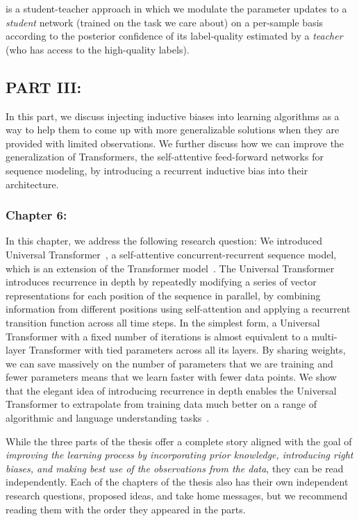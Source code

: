 \fwl is a student-teacher approach in which we modulate the parameter updates to a \emph{student} network (trained on the task we care about) on a per-sample basis according to the posterior confidence of its label-quality estimated by a \emph{teacher} (who has access to the high-quality labels).  

\subsection*{PART III: }
In this part, we discuss injecting inductive biases into learning algorithms as a way to help them to come up with more generalizable solutions when they are provided with limited observations. We further discuss how we can improve the generalization of Transformers, the self-attentive feed-forward networks for sequence modeling, by introducing a recurrent inductive bias into their architecture.

\subsubsection*{Chapter 6: }
In this chapter, we address the following research question:
We introduced Universal Transformer~\citep{Dehghani:ICLR:2019}, a self-attentive concurrent-recurrent sequence model, which is an extension of the Transformer model~\citep{vaswani2017attention}. The Universal Transformer introduces recurrence in depth by repeatedly modifying a series of vector representations for each position of the sequence in parallel, by combining information from different positions using self-attention and applying a recurrent transition function across all time steps. 
In the simplest form, a Universal Transformer with a fixed number of iterations is almost equivalent to a multi-layer Transformer with tied parameters across all its layers. By sharing weights, we can save massively on the number of parameters that we are training and fewer parameters means that we learn faster with fewer data points.  We show that the elegant idea of introducing recurrence in depth enables the Universal Transformer to extrapolate from training data much better on a range of algorithmic and language understanding tasks~\citep{Dehghani:ICLR:2019, Dehghani:2019:WSDM}.

\bigskip
While the three parts of the thesis offer a complete story aligned with the goal of \emph{improving the learning process by incorporating prior knowledge, introducing right biases, and making best use of the observations from the data}, they can be read independently. 
Each of the chapters of the thesis also has their own independent research questions, proposed ideas, and take home messages, but we recommend reading them with the order they appeared in the parts.



